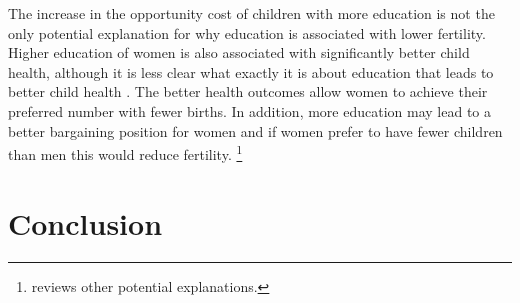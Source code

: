 \documentclass[letterpaper,12pt]{article}
\begin{document}
The increase in the opportunity cost of children with more education is
not the only potential explanation for why education is associated with
lower fertility.
Higher education of women is also associated with significantly better
child health, although it is less clear what exactly it is about
education that leads to better child health
\citep{Thomas1991,Glewwe1999,Kovsted2002}.
The better health outcomes allow women to achieve their preferred number
with fewer births.
In addition, more education may lead to a better bargaining position for
women and if women prefer to have fewer children than men this would
reduce fertility.%
\footnote{
\citet{Ainsworth1996} reviews other potential explanations.}

\section{Conclusion}



\end{document}
